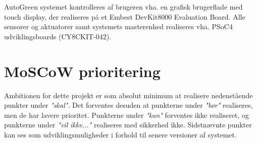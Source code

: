 AutoGreen systemet kontrolleres af brugeren vha. en grafisk brugerflade med touch display, der realiseres på et Embest DevKit8000 Evaluation Board. \cite{lib:DK8000}
Alle sensorer og aktuatorer samt systemets masterenhed realiseres vha. PSoC4 udviklingsboards (CY8CKIT-042). \cite{lib:psoc4_guide}

\clearpage

\section{MoSCoW prioritering}
Ambitionen for dette projekt er som absolut minimum at realisere nedenstående punkter under \textit{"skal"}. 
Det forventes desuden at punkterne under \textit{"bør"} realiseres, men de har lavere prioritet.
Punkterne under \textit{"kan"} forventes ikke realiseret, og punkterne under \textit{"vil ikke..."} realiseres med sikkerhed ikke. 
Sidstnævnte punkter kan ses som udviklingsmuligheder i forhold til senere versioner af systemet. 

